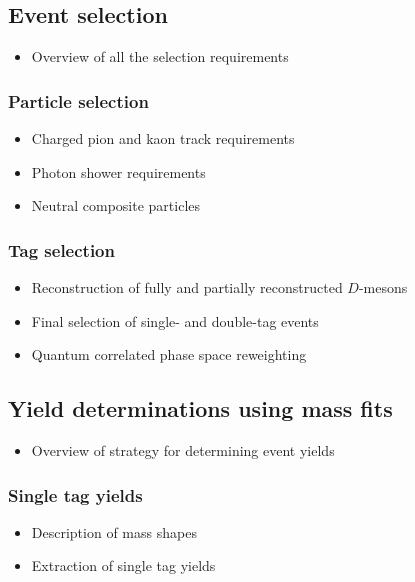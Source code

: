 \documentclass[12pt, a4paper, notitlepage, onecolumn]{article}
\begin{document}
\subsection{Event selection}
  \begin{itemize}[nosep]
    \setlength{\itemindent}{2em}
    \item[\textendash]{Overview of all the selection requirements}
  \end{itemize}
\subsubsection{Particle selection}
  \begin{itemize}[nosep]
    \setlength{\itemindent}{2.5em}
    \item[\textasteriskcentered]{Charged pion and kaon track requirements}
    \item[\textasteriskcentered]{Photon shower requirements}
    \item[\textasteriskcentered]{Neutral composite particles}
  \end{itemize}
\subsubsection{Tag selection}
  \begin{itemize}[nosep]
    \setlength{\itemindent}{2.5em}
    \item[\textasteriskcentered]{Reconstruction of fully and partially reconstructed $D$-mesons}
    \item[\textasteriskcentered]{Final selection of single- and double-tag events}
    \item[\textasteriskcentered]{Quantum correlated phase space reweighting}
  \end{itemize}
\subsection{Yield determinations using mass fits}
  \begin{itemize}[nosep]
    \setlength{\itemindent}{2em}
    \item[\textendash]{Overview of strategy for determining event yields}
  \end{itemize}
\subsubsection{Single tag yields}
  \begin{itemize}[nosep]
    \setlength{\itemindent}{2.5em}
    \item[\textasteriskcentered]{Description of mass shapes}
    \item[\textasteriskcentered]{Extraction of single tag yields}
  \end{itemize}
\end{document}
